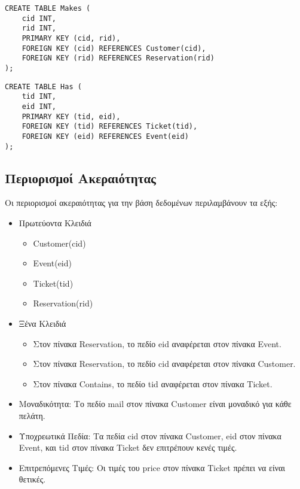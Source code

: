 \documentclass{article}
\begin{document}
\begin{lstlisting}
CREATE TABLE Makes (
    cid INT,
    rid INT,
    PRIMARY KEY (cid, rid),
    FOREIGN KEY (cid) REFERENCES Customer(cid),
    FOREIGN KEY (rid) REFERENCES Reservation(rid)
);
\end{lstlisting}

\begin{lstlisting}
CREATE TABLE Has (
    tid INT,
    eid INT,
    PRIMARY KEY (tid, eid),
    FOREIGN KEY (tid) REFERENCES Ticket(tid),
    FOREIGN KEY (eid) REFERENCES Event(eid)
);
\end{lstlisting}
\subsection*{Περιορισμοί Ακεραιότητας}
Οι περιορισμοί ακεραιότητας για την βάση δεδομένων περιλαμβάνουν τα εξής:
\begin{itemize}
    \item Πρωτεύοντα Κλειδιά
    \begin{itemize}
        \item Customer(cid)
        \item Event(eid)
        \item Ticket(tid)
        \item Reservation(rid)
    \end{itemize}
    \item Ξένα Κλειδιά
    \begin{itemize}
        \item Στον πίνακα Reservation, το πεδίο eid αναφέρεται στον πίνακα Event.
        \item Στον πίνακα Reservation, το πεδίο cid αναφέρεται στον πίνακα Customer.
        \item Στον πίνακα Contains, το πεδίο tid αναφέρεται στον πίνακα Ticket.
    \end{itemize}
    \item Μοναδικότητα: Το πεδίο mail στον πίνακα Customer είναι μοναδικό για κάθε πελάτη.
    \item Υποχρεωτικά Πεδία: Τα πεδία cid στον πίνακα Customer, eid στον πίνακα Event, και tid στον πίνακα Ticket δεν επιτρέπουν κενές τιμές.
    \item Επιτρεπόμενες Τιμές: Οι τιμές του price στον πίνακα Ticket πρέπει να είναι θετικές.
\end{itemize}
\end{document}

